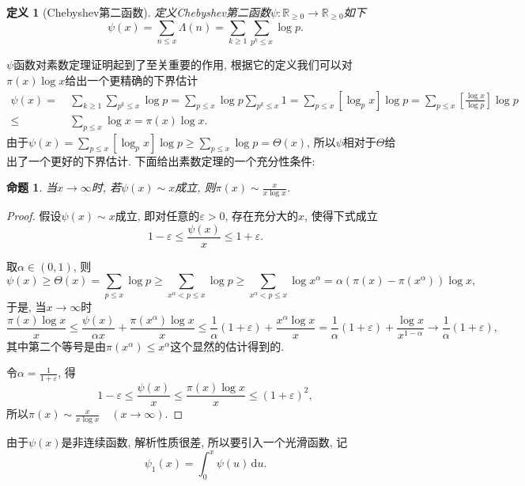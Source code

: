 \documentclass[12pt, a4paper, oneside]{ctexart}
\newtheorem{definition}{定义}[section]
\newtheorem{proposition}{命题}[section]
\numberwithin{equation}{section}  %
\let\leq=\leqslant %
\let\geq=\geqslant %
\let\epsilon=\varepsilon %
\def\R{\mathbb{R}}          %
\def\d{\mathrm{d}}          %
\def\add{\vspace{1ex}}      %
\begin{document}
\begin{definition}[Chebyshev第二函数]
    定义Chebyshev第二函数$\psi:\R_{\geq 0}\to\R_{\geq 0}$如下
    \begin{equation*}
        \psi(x) = \sum_{n\leq x}\Lambda(n) = \sum_{k\geq 1}\sum_{p^k\leq x}\log p.
    \end{equation*}
\end{definition}
$\psi$函数对素数定理证明起到了至关重要的作用, 根据它的定义我们可以对$\pi(x)\log x$给出一个更精确的下界估计
\begin{equation*}
    \begin{aligned}
        \psi(x) =&\ \sum_{k\geq 1}\sum_{p^k\leq x}\log p = \sum_{p\leq x}\log p\sum_{p^k\leq x}1
        = \sum_{p\leq x}[\log_p x]\log p = \sum_{p\leq x}\left[\frac{\log x}{\log p}\right]\log p\\
        \leq&\ \sum_{p\leq x}\log x = \pi(x)\log x.
    \end{aligned}
\end{equation*}
由于$\psi(x) = \sum_{p\leq x}[\log_p x]\log p \geq \sum_{p\leq x}\log p = \Theta(x)$, 所以$\psi$相对于$\Theta$给出了一个更好的下界估计.
下面给出素数定理的一个充分性条件:
\begin{proposition}
    当$x\to\infty$时, 若$\psi(x)\sim x$成立, 则$\pi(x)\sim \frac{x}{x\log x}$.
\end{proposition}
\begin{proof}
    假设$\psi(x)\sim x$成立, 即对任意的$\epsilon > 0$, 存在充分大的$x$, 使得下式成立
    \begin{equation*}
        1-\epsilon\leq \frac{\psi(x)}{x}\leq 1+\epsilon.
    \end{equation*}
    
    取$\alpha \in (0,1)$, 则
    \begin{equation*}
        \psi(x)\geq\Theta(x) = \sum_{p\leq x}\log p\geq\sum_{x^{\alpha} < p\leq x}\log p\geq \sum_{x^{\alpha} < p\leq x}\log x^{\alpha} = \alpha(\pi(x)-\pi(x^{\alpha}))\log x,
    \end{equation*}
    于是, 当$x\to\infty$时
    \begin{equation*}
        \frac{\pi(x)\log x}{x}\leq \frac{\psi(x)}{\alpha x}+\frac{\pi(x^{\alpha})\log x}{x}\leq \frac{1}{\alpha}(1+\epsilon)+\frac{x^{\alpha}\log x}{x}=\frac{1}{\alpha}(1+\epsilon)+\frac{\log x}{x^{1-\alpha}}\to \frac{1}{\alpha}(1+\epsilon),
    \end{equation*}
    其中第二个等号是由$\pi(x^{\alpha})\leq x^{\alpha}$这个显然的估计得到的.\add

    令$\alpha = \frac{1}{1+\epsilon}$, 得
    \begin{equation*}
        1-\epsilon\leq \frac{\psi(x)}{x}\leq\frac{\pi(x)\log x}{x}\leq(1+\epsilon)^2,
    \end{equation*}
    所以$\pi(x)\sim\frac{x}{x\log x}\quad(x\to \infty)$.
\end{proof}
由于$\psi(x)$是非连续函数, 解析性质很差, 所以要引入一个光滑函数, 记
\begin{equation*}
    \psi_1(x) = \int_0^x\psi(u)\,\d u.
\end{equation*}
\end{document}
